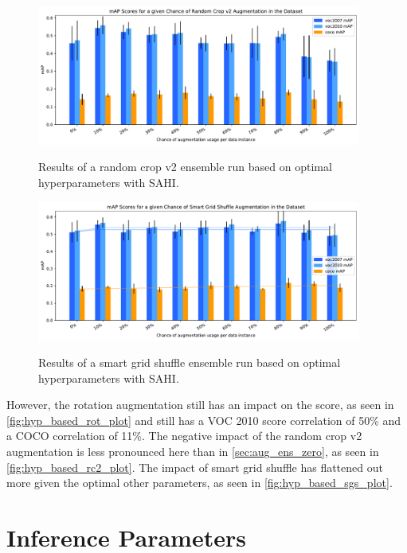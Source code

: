 \documentclass[10pt]{book}
\newcommand{\figureref}[1]{\autoref{#1}}
\begin{document}
\begin{figure}
  \caption{Results of a random crop v2 ensemble run based on optimal hyperparameters with \ac{SAHI}.}
  \includegraphics[width=0.95\textwidth]{image/hyp-based-rc2-sahi-ensemble-2-thesis-2}
  \label{fig:hyp_based_rc2_plot}
\end{figure}

\begin{figure}
  \caption{Results of a smart grid shuffle ensemble run based on optimal hyperparameters with \ac{SAHI}.}
  \includegraphics[width=0.95\textwidth]{image/hyp-based-sgs-sahi-ensemble-2-thesis-2}
  \label{fig:hyp_based_sgs_plot}
\end{figure}

However, the rotation augmentation still has an impact on the score, as seen in \figureref{fig:hyp_based_rot_plot} and still has a VOC 2010 score correlation of 50\% and a \ac{COCO} correlation of 11\%. The negative impact of the random crop v2 augmentation is less pronounced here than in \autoref{sec:aug_ens_zero}, as seen in \figureref{fig:hyp_based_rc2_plot}. The impact of smart grid shuffle has flattened out more given the optimal other parameters, as seen in \figureref{fig:hyp_based_sgs_plot}.

\section{Inference Parameters}
\label{sec:inference_params}
\end{document}
